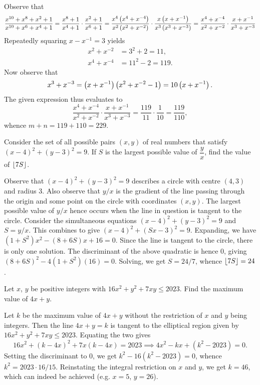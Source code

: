 Observe that \[\frac{x^{10} + x^8 + x^2 + 1}{x^{10} + x^6 + x^4 + 1} = \frac{x^8 + 1}{x^4 + 1} \cdot \frac{x^2+1}{x^6+1} = \frac{x^4\left( x^4 + x^{-4} \right)}{x^2\left( x^2 + x^{-2} \right)} \cdot \frac{x\left( x+x^{-1} \right)}{x^3\left( x^3+x^{-3} \right)} = \frac{x^4 + x^{-4}}{x^2 + x^{-2}} \cdot \frac{x+x^{-1}}{x^3+x^{-3}}\]
Repeatedly squaring $x - x^{-1} = 3$ yields
\begin{align*}
    x^2 + x^{-2} &= 3^2 + 2 = 11,\\
    x^4 + x^{-4} &= 11^2 - 2 = 119.
\end{align*}
Now observe that \[x^3 + x^{-3} = \left( x + x^{-1} \right)\left( x^2 + x^{-2} - 1 \right) = 10\left( x + x^{-1} \right).\] The given expression thus evaluates to \[\frac{x^4 + x^{-4}}{x^2 + x^{-2}} \cdot \frac{x+x^{-1}}{x^3+x^{-3}} = \frac{119}{11} \cdot \frac1{10} = \frac{119}{110},\] whence $m + n = 119 + 110 = 229$.

\begin{question}[24]\label{A::2023-O-1-14}
    Consider the set of all possible pairs $(x, y)$ of real numbers that satisfy $(x-4)^2 + (y-3)^2 = 9$. If $S$ is the largest possible value of $\dfrac{y}{x}$, find the value of $\left\lfloor 7S \right\rfloor$.
\end{question}

Observe that $(x-4)^2 + (y-3)^2 = 9$ describes a circle with centre $(4, 3)$ and radius 3. Also observe that $y/x$ is the gradient of the line passing through the origin and some point on the circle with coordinates $(x, y)$. The largest possible value of $y/x$ hence occurs when the line in question is tangent to the circle. Consider the simultaneous equations $(x-4)^2 + (y-3)^2 = 9$ and $S = y/x$. This combines to give $(x-4)^2 + (Sx - 3)^2 = 9$. Expanding, we have $(1+S^2)x^2 - (8+6S)x + 16 = 0$. Since the line is tangent to the circle, there is only one solution. The discriminant of the above quadratic is hence 0, giving $(8+6S)^2 - 4(1+S^2)(16) = 0$. Solving, we get $S = 24/7$, whence $\left\lfloor 7S \right\rfloor = 24$.

\begin{question}[46]\label{A::2023-O-1-15}
    Let $x$, $y$ be positive integers with $16x^2 + y^2 + 7xy \leq 2023$. Find the maximum value of $4x + y$.
\end{question}

Let $k$ be the maximum value of $4x + y$ without the restriction of $x$ and $y$ being integers. Then the line $4x + y = k$ is tangent to the elliptical region given by $16x^2 + y^2 + 7xy \leq 2023$. Equating the two gives \[16x^2 + (k-4x)^2 + 7x(k-4x) = 2023 \implies 4x^2 - kx + (k^2 - 2023) = 0.\] Setting the discriminant to 0, we get $k^2 - 16(k^2 - 2023) = 0$, whence $k^2 = 2023 \cdot 16 / 15$. Reinstating the integral restriction on $x$ and $y$, we get $k = 46$, which can indeed be achieved (e.g. $x = 5$, $y = 26$).

